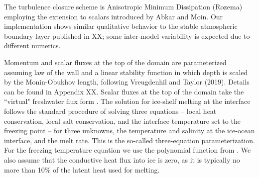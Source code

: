 The turbulence closure scheme is Anisotropic Minimum Dissipation (Rozema) employing the extension to scalars introduced by Abkar and Moin. Our implementation shows similar qualitative behavior to the stable atmospheric boundary layer published in XX; some inter-model variability is expected due to different numerics.

Momentum and scalar fluxes at the top of the domain are parameterized assuming law of the wall and a linear stability function in which depth is scaled by the Monin-Obukhov length, following Vreugdenhil and Taylor (2019). Details can be found in Appendix XX. Scalar fluxes at the top of the domain take the ``virtual" freshwater flux form \cite{XX}. The solution for ice-shelf melting at the interface follows the standard procedure of solving three equations -- local heat conservation, local salt conservation, and the interface temperature set to the freezing point -- for three unknowns, the temperature and salinity at the ice-ocean interface, and the melt rate. This is the so-called three-equation parameterization. For the freezing temperature equation we use the polynomial function from \cite{jackett_2006}. We also assume that the conductive heat flux into ice is zero, as it is typically no more than 10\% of the latent heat used for melting.